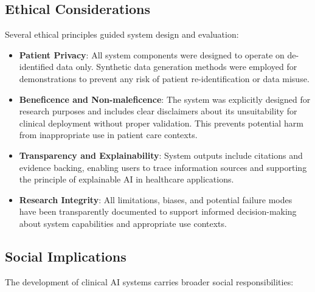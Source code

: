 \subsection{Ethical Considerations}

Several ethical principles guided system design and evaluation:

\begin{itemize}
    \item \textbf{Patient Privacy}: All system components were designed to operate on de-identified data only. Synthetic data generation methods were employed for demonstrations to prevent any risk of patient re-identification or data misuse.
    
    \item \textbf{Beneficence and Non-maleficence}: The system was explicitly designed for research purposes and includes clear disclaimers about its unsuitability for clinical deployment without proper validation. This prevents potential harm from inappropriate use in patient care contexts.
    
    \item \textbf{Transparency and Explainability}: System outputs include citations and evidence backing, enabling users to trace information sources and supporting the principle of explainable AI in healthcare applications.
    
    \item \textbf{Research Integrity}: All limitations, biases, and potential failure modes have been transparently documented to support informed decision-making about system capabilities and appropriate use contexts.
\end{itemize}

\subsection{Social Implications}

The development of clinical AI systems carries broader social responsibilities:

